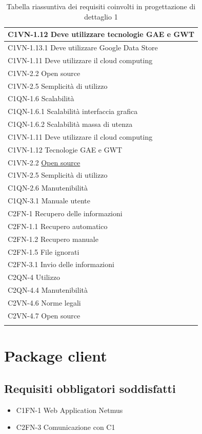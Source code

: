 \begin{footnotesize}
\begin{longtable}[!h]{|l|}
C1VN-1.12 Deve utilizzare tecnologie GAE e GWT \\ \hline 
C1VN-1.13.1 Deve utilizzare Google Data Store \\ \hline
C1VN-1.11 Deve utilizzare il cloud computing \\ \hline
C1VN-2.2 Open source \\ \hline
C1VN-2.5 Semplicit\`a di utilizzo \\ \hline
C1QN-1.6 Scalabilit\`a \\ \hline
C1QN-1.6.1 Scalabilit\`a interfaccia grafica \\ \hline
C1QN-1.6.2 Scalabilit\`a massa di utenza \\ \hline
C1VN-1.11 Deve utilizzare il cloud computing \\ \hline
C1VN-1.12 Tecnologie GAE e GWT \\ \hline
C1VN-2.2 \underline{Open source} \\ \hline
C1VN-2.5 Semplicit\`a di utilizzo \\ \hline
C1QN-2.6 Manutenibilit\`a \\ \hline
C1QN-3.1 Manuale utente \\ \hline
C2FN-1 Recupero delle informazioni \\ \hline
C2FN-1.1 Recupero automatico \\ \hline
C2FN-1.2 Recupero manuale \\ \hline
C2FN-1.5 File ignorati \\ \hline
C2FN-3.1 Invio delle informazioni \\ \hline
C2QN-4 Utilizzo \\ \hline
C2QN-4.4 Manutenibilit\`a \\ \hline
C2VN-4.6 Norme legali \\ \hline
C2VN-4.7 Open source \\ \hline
\caption{Tabella riassuntiva dei requisiti coinvolti in progettazione di
dettaglio 1}
\end{longtable}
\end{footnotesize}

\newpage
\section{Package client}
\subsection*{Requisiti obbligatori soddisfatti}
\begin{itemize}
	\item C1FN-1 Web Application Netmus
	\item C2FN-3 Comunicazione con C1
\end{itemize}
